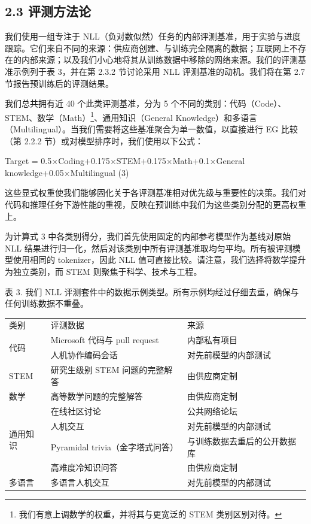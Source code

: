 \subsection{2.3 评测方法论}\label{evaluation-methodology}

我们使用一组专注于 NLL（负对数似然）任务的内部评测基准，用于实验与进度跟踪。它们来自不同的来源：供应商创建、与训练完全隔离的数据；互联网上不存在的内部来源；以及我们小心地将其从训练数据中移除的网络来源。我们的评测基准示例列于表 3，并在第 2.3.2 节讨论采用 NLL 评测基准的动机。我们将在第 2.7 节报告预训练后的评测结果。

我们总共拥有近 40 个此类评测基准，分为 5 个不同的类别：代码（Code）、STEM、数学（Math）\footnote{我们有意上调数学的权重，并将其与更宽泛的 STEM 类别区别对待。}、通用知识（General Knowledge）和多语言（Multilingual）。当我们需要将这些基准聚合为单一数值，以直接进行 EG 比较（第 2.2.2 节）或对模型排序时，我们使用以下公式：



Target = 0.5$\times$Coding+0.175$\times$STEM+0.175$\times$Math+0.1$\times$General
knowledge+0.05$\times$Multilingual (3)

这些显式权重使我们能够固化关于各评测基准相对优先级与重要性的决策。我们对代码和推理任务下游性能的重视，反映在预训练中我们为这些类别分配的更高权重上。

为计算式 3 中各类别得分，我们首先使用固定的内部参考模型作为基线对原始 NLL 结果进行归一化，然后对该类别中所有评测基准取均匀平均。所有被评测模型使用相同的 tokenizer，因此 NLL 值可直接比较。请注意，我们选择将数学提升为独立类别，而 STEM 则聚焦于科学、技术与工程。

表 3. 我们 NLL 评测套件中的数据示例类型。所有示例均经过仔细去重，确保与任何训练数据不重叠。

{\def\LTcaptype{none} %
\begin{longtable}[]{@{}lll@{}}
\toprule\noalign{}
\endhead
\bottomrule\noalign{}
\endlastfoot
类别 & 评测数据 & 来源 \\
\multirow{2}{*}{代码} & Microsoft 代码与 pull request & 内部私有项目 \\
& 人机协作编码会话 & 对先前模型的内部测试 \\
STEM & 研究生级别 STEM 问题的完整解答 & 由供应商定制 \\
数学 & 高等数学问题的完整解答 & 由供应商定制 \\
\multirow{4}{*}{通用知识} & 在线社区讨论 & 公共网络论坛 \\
& 人机交互 & 对先前模型的内部测试 \\
& Pyramidal trivia（金字塔式问答） & 与训练数据去重后的公开数据库 \\
& 高难度冷知识问答 & 由供应商定制 \\
多语言 & 多语言人机交互 & 对先前模型的内部测试 \\
\end{longtable}
}

